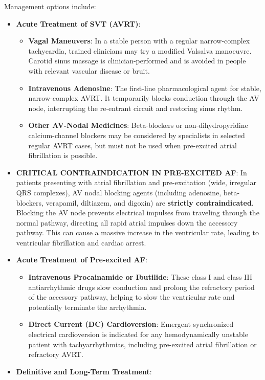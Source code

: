 Management options include:
\begin{itemize}
  \item \textbf{Acute Treatment of SVT (AVRT)}:
    \begin{itemize}
      \item \textbf{Vagal Maneuvers}: In a stable person with a regular narrow-complex tachycardia, trained clinicians may try a modified Valsalva manoeuvre. Carotid sinus massage is clinician-performed and is avoided in people with relevant vascular disease or bruit.
      \item \textbf{Intravenous Adenosine}: The first-line pharmacological agent for stable, narrow-complex AVRT. It temporarily blocks conduction through the AV node, interrupting the re-entrant circuit and restoring sinus rhythm.
      \item \textbf{Other AV-Nodal Medicines}: Beta-blockers or non-dihydropyridine calcium-channel blockers may be considered by specialists in selected regular AVRT cases, but must not be used when pre-excited atrial fibrillation is possible.
    \end{itemize}
  \item \textbf{CRITICAL CONTRAINDICATION IN PRE-EXCITED AF}: In patients presenting with atrial fibrillation and pre-excitation (wide, irregular QRS complexes), AV nodal blocking agents (including adenosine, beta-blockers, verapamil, diltiazem, and digoxin) are \textbf{strictly contraindicated}. Blocking the AV node prevents electrical impulses from traveling through the normal pathway, directing all rapid atrial impulses down the accessory pathway. This can cause a massive increase in the ventricular rate, leading to ventricular fibrillation and cardiac arrest.
  \item \textbf{Acute Treatment of Pre-excited AF}:
    \begin{itemize}
      \item \textbf{Intravenous Procainamide or Ibutilide}: These class I and class III antiarrhythmic drugs slow conduction and prolong the refractory period of the accessory pathway, helping to slow the ventricular rate and potentially terminate the arrhythmia.
      \item \textbf{Direct Current (DC) Cardioversion}: Emergent synchronized electrical cardioversion is indicated for any hemodynamically unstable patient with tachyarrhythmias, including pre-excited atrial fibrillation or refractory AVRT.
    \end{itemize}
  \item \textbf{Definitive and Long-Term Treatment}:

\end{itemize}
